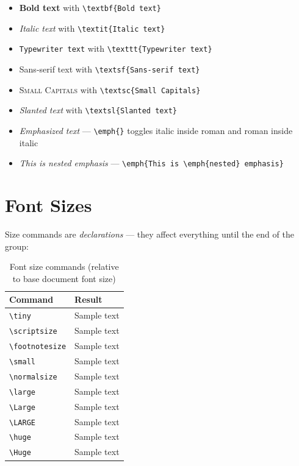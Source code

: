 \begin{itemize}
    \item \textbf{Bold text} with \verb|\textbf{Bold text}|
    \item \textit{Italic text} with \verb|\textit{Italic text}|
    \item \texttt{Typewriter text} with \verb|\texttt{Typewriter text}|
    \item \textsf{Sans-serif text} with \verb|\textsf{Sans-serif text}|
    \item \textsc{Small Capitals} with \verb|\textsc{Small Capitals}|
    \item \textsl{Slanted text} with \verb|\textsl{Slanted text}|
    \item \emph{Emphasized text} — \verb|\emph{}| toggles italic inside roman and roman inside italic
    \item \emph{This is \emph{nested} emphasis} — \verb|\emph{This is \emph{nested} emphasis}|
\end{itemize}

\section{Font Sizes}

Size commands are \emph{declarations} — they affect everything until the end of the group:

\begin{table}[H]
\centering
\begin{tabular}{ll}
\toprule
\textbf{Command} & \textbf{Result} \\
\midrule
\verb|\tiny|         & {\tiny Sample text} \\
\verb|\scriptsize|   & {\scriptsize Sample text} \\
\verb|\footnotesize| & {\footnotesize Sample text} \\
\verb|\small|        & {\small Sample text} \\
\verb|\normalsize|   & {\normalsize Sample text} \\
\verb|\large|        & {\large Sample text} \\
\verb|\Large|        & {\Large Sample text} \\
\verb|\LARGE|        & {\LARGE Sample text} \\
\verb|\huge|         & {\huge Sample text} \\
\verb|\Huge|         & {\Huge Sample text} \\
\bottomrule
\end{tabular}
\caption{Font size commands (relative to base document font size)}
\end{table}

